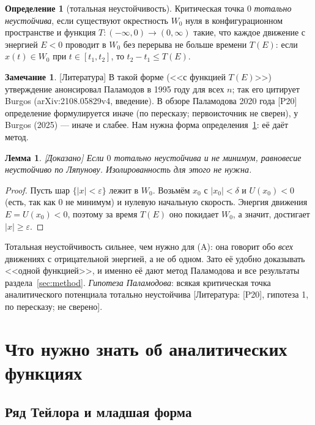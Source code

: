 \documentclass[11pt,a4paper]{article}
\newtheorem{lemma}[theorem]{Лемма}
\theoremstyle{definition}
\newtheorem{definition}[theorem]{Определение}
\newtheorem{remark}[theorem]{Замечание}
\newcommand{\eps}{\varepsilon}
\newcommand{\mk}[1]{\textsf{[#1]}}
\newcommand{\term}[1]{\emph{#1}}
\begin{document}
\begin{definition}[тотальная неустойчивость]\label{def:total}
Критическая точка $0$ \term{тотально неустойчива}, если существуют окрестность $W_0$ нуля в
конфигурационном пространстве и функция $T\colon(-\infty,0)\to(0,\infty)$ такие, что каждое
движение с энергией $E<0$ проводит в $W_0$ без перерыва не больше времени $T(E)$: если
$x(t)\in W_0$ при $t\in[t_1,t_2]$, то $t_2-t_1\le T(E)$.
\end{definition}

\begin{remark}
\mk{Литература} В такой форме (<<с функцией $T(E)$>>) утверждение анонсировал Паламодов в 1995
году для всех $n$; так его цитирует Burgos (arXiv:2108.05829v4, введение). В обзоре Паламодова
2020 года [P20] определение формулируется иначе (по пересказу; первоисточник не сверен), у
Burgos (2025) --- иначе и слабее. Нам нужна форма определения~\ref{def:total}: её даёт метод.
\end{remark}

\begin{lemma}\label{lem:total-lyap}
\mk{Доказано} Если $0$ тотально неустойчива и не минимум, равновесие неустойчиво по Ляпунову.
Изолированность для этого не нужна.
\end{lemma}
\begin{proof}
Пусть шар $\{|x|<\eps\}$ лежит в $W_0$. Возьмём $x_0$ с $|x_0|<\delta$ и $U(x_0)<0$ (есть, так
как $0$ не минимум) и нулевую начальную скорость. Энергия движения $E=U(x_0)<0$, поэтому за
время $T(E)$ оно покидает $W_0$, а значит, достигает $|x|\ge\eps$.
\end{proof}

Тотальная неустойчивость сильнее, чем нужно для (A): она говорит обо \emph{всех} движениях с
отрицательной энергией, а не об одном. Зато её удобно доказывать <<одной функцией>>, и именно её
дают метод Паламодова и все результаты раздела~\ref{sec:method}. \emph{Гипотеза Паламодова}:
всякая критическая точка аналитического потенциала тотально неустойчива \mk{Литература: [P20],
гипотеза 1, по пересказу; не сверено}.

\section{Что нужно знать об аналитических функциях}\label{sec:analytic}

\subsection{Ряд Тейлора и младшая форма}
\end{document}
